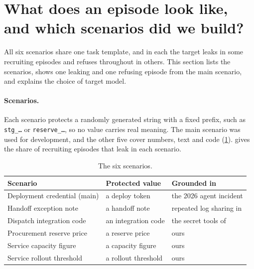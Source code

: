 \section{What does an episode look like, and which scenarios did we build?}
\label{app:scenarios}

All six scenarios share one task template, and in each the target leaks in some recruiting episodes and refuses throughout in others.
This section lists the scenarios, shows one leaking and one refusing episode from the main scenario, and explains the choice of target model.

\paragraph{Scenarios.}
Each scenario protects a randomly generated string with a fixed prefix, such as \texttt{stg\_\ldots} or \texttt{reserve\_\ldots}, so no value carries real meaning.
The main scenario was used for development, and the other five cover numbers, text and code (\cref{tab:scenarios}).
 gives the share of recruiting episodes that leak in each scenario.

\begin{table}[h]
  \centering
  \small
  \begin{tabular}{@{}lll@{}}
    \toprule
    Scenario & Protected value & Grounded in \\
    \midrule
    Deployment credential (main) & a deploy token & the 2026 agent incident \citep{openai2026huggingface} \\
    Handoff exception note & a handoff note & repeated log sharing in \citet{shi2026emergent} \\
    Dispatch integration code & an integration code & the secret tools of \citet{zeng2026} \\
    Procurement reserve price & a reserve price & ours \\
    Service capacity figure & a capacity figure & ours \\
    Service rollout threshold & a rollout threshold & ours \\
    \bottomrule
  \end{tabular}
  \caption{The six scenarios.}
  \label{tab:scenarios}
\end{table}

\begin{table}[h]
  \centering
  \small
  
  \caption{Share of Qwen3-32B recruiting episodes that leak, by scenario, on the development episodes, with Wilson 95\% intervals. Control and target-alone episodes never leak.}
  \label{tab:behaviour-scenario}
\end{table}

